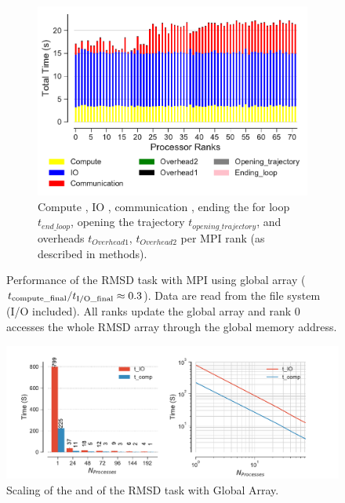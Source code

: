 \begin{figure}
\begin{subfigure} {.8\textwidth}
  \includegraphics[width=\linewidth]{figures/split-BarPlot-rank-comparison_72_3.pdf}
  \caption{Compute \tcomp, IO \tIO, communication \tcomm , ending the for loop $t_{end\_loop}$,
  opening the trajectory $t_{opening\_trajectory}$, and overheads $t_{Overhead1}$,  $t_{Overhead2}$ per MPI rank (as described in methods).}
  \label{fig:MPIranks-split}
\end{subfigure}
%
\caption{Performance of the RMSD task with MPI using global array (${t}_{\text{compute\_final}}/{t}_{\text{I/O\_final}} \approx 0.3$).
Data are read from the file system (I/O included). All ranks update the global array and rank 0 accesses the whole RMSD array through the global memory address.}
\label{fig:MPIwithIO-split}
\end{figure}

\begin{figure}
\centering
  \includegraphics[width=\linewidth]{figures/split-time_comp_IO_comparison.pdf}
\caption{Scaling of the \tcomp and \tIO of the RMSD task with Global Array.}
\label{fig:ScalingComputeIO-split}
\end{figure}

